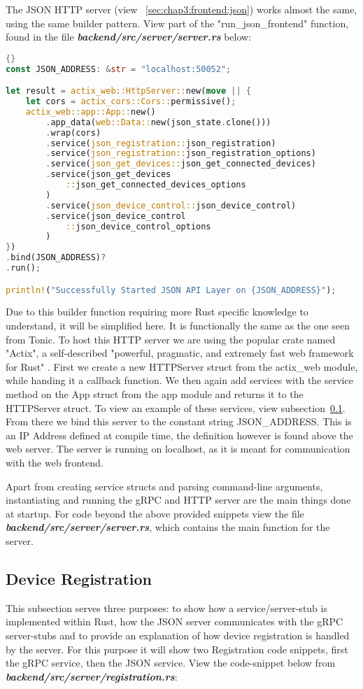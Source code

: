 The JSON HTTP server (view ~\ref{sec:chap3:frontend:json}) works almost the same, using the same builder pattern. View part of the "run\_json\_frontend" function, found in the file \textbf{\textit{backend/src/server/server.rs}} below:
\begin{lstlisting}[language=Rust, style=boxed, showstringspaces=false]{}
const JSON_ADDRESS: &str = "localhost:50052";

let result = actix_web::HttpServer::new(move || {
    let cors = actix_cors::Cors::permissive();
    actix_web::app::App::new()
        .app_data(web::Data::new(json_state.clone()))
        .wrap(cors)
        .service(json_registration::json_registration)
        .service(json_registration::json_registration_options)
        .service(json_get_devices::json_get_connected_devices)
        .service(json_get_devices
            ::json_get_connected_devices_options
        )
        .service(json_device_control::json_device_control)
        .service(json_device_control
            ::json_device_control_options
        )
})
.bind(JSON_ADDRESS)?
.run();

println!("Successfully Started JSON API Layer on {JSON_ADDRESS}");
\end{lstlisting}
Due to this builder function requiring more Rust specific knowledge to understand, it will be simplified here. It is functionally the same as the one seen from Tonic. To host this HTTP server we are using the popular crate named "Actix", a self-described "powerful, pragmatic, and extremely fast web framework for Rust" \cite{actixWebsite}. First we create a new HTTPServer struct from the actix\_web module, while handing it a callback function. We then again add services with the service method on the App struct from the app module and returns it to the HTTPServer struct. To view an example of these services, view subsection~\ref{sec:chap3:server:registration}. From there we bind this server to the constant string JSON\_ADDRESS. This is an IP Address defined at compile time, the definition however is found above the web server. The server is running on localhost, as it is meant for communication with the web frontend.

Apart from creating service structs and parsing command-line arguments, instantiating and running the gRPC and HTTP server are the main things done at startup. For code beyond the above provided snippets view the file \textbf{\textit{backend/src/server/server.rs}}, which contains the main function for the server.

\subsection{Device Registration} \label{sec:chap3:server:registration} 
This subsection serves three purposes: to show how a service/server-stub is implemented within Rust, how the JSON server communicates with the gRPC server-stubs and to provide an explanation of how device registration is handled by the server. For this purpose it will show two Registration code snippets, first the gRPC service, then the JSON service. View the code-snippet below from \textbf{\textit{backend/src/server/registration.rs}}:

